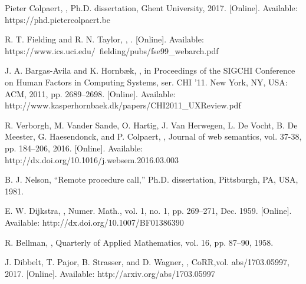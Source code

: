 \documentclass[twocolumn]{phdsymp} %
\begin{document}
%
\begin{thebibliography}{1}
Pieter Colpaert,
,
\newblock Ph.D. dissertation, Ghent University, 2017. [Online]. Available: https://phd.pietercolpaert.be

R. T. Fielding and R. N. Taylor, 
,
. [Online]. Available: https://www.ics.uci.edu/~fielding/pubs/fse99\_webarch.pdf

J. A. Bargas-Avila and K. Hornbæk, 
,
in Proceedings of the SIGCHI Conference on Human Factors in Computing Systems, ser. CHI ’11. New York, NY, USA: ACM, 2011, pp. 2689–2698. [Online]. Available: http://www.kasperhornbaek.dk/papers/CHI2011\_UXReview.pdf

R. Verborgh, M. Vander Sande, O. Hartig, J. Van Herwegen, L. De Vocht, B. De Meester, G. Haesendonck, and P. Colpaert, 
,
\newblock Journal of web semantics, vol. 37-38, pp. 184–206, 2016. [Online]. Available: http://dx.doi.org/10.1016/j.websem.2016.03.003

B. J. Nelson, “Remote procedure call,” Ph.D. dissertation, Pittsburgh, PA, USA, 1981.

E. W. Dijkstra, 
,
\newblock Numer. Math., vol. 1, no. 1, pp. 269–271, Dec. 1959. [Online]. Available: http://dx.doi.org/10.1007/BF01386390

R. Bellman,
,
\newblock Quarterly of Applied Mathematics, vol. 16, pp. 87–90, 1958.

J. Dibbelt, T. Pajor, B. Strasser, and D. Wagner,
,
\newblock CoRR,vol. abs/1703.05997, 2017. [Online]. Available: http://arxiv.org/abs/1703.05997

\end{thebibliography}
%
\end{document}
